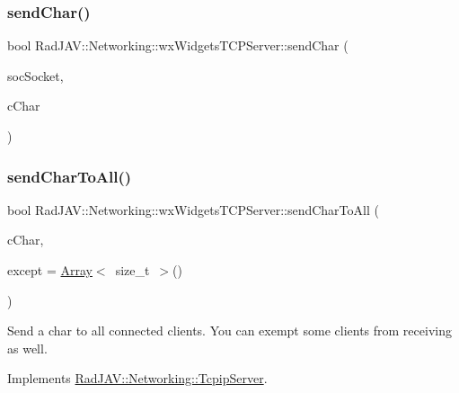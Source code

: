 \subsubsection{\texorpdfstring{send\+Char()}{sendChar()}}
{\footnotesize\ttfamily bool Rad\+J\+A\+V\+::\+Networking\+::wx\+Widgets\+T\+C\+P\+Server\+::send\+Char (\begin{DoxyParamCaption}\item[{wx\+Socket\+Base $\ast$}]{soc\+Socket,  }\item[{char}]{c\+Char }\end{DoxyParamCaption})}

\mbox{\label{class_rad_j_a_v_1_1_networking_1_1wx_widgets_t_c_p_server_a4a78814fc536f2c8a932d3fcf8c2c1dd}} 
\subsubsection{\texorpdfstring{send\+Char\+To\+All()}{sendCharToAll()}}
{\footnotesize\ttfamily bool Rad\+J\+A\+V\+::\+Networking\+::wx\+Widgets\+T\+C\+P\+Server\+::send\+Char\+To\+All (\begin{DoxyParamCaption}\item[{char}]{c\+Char,  }\item[{\mbox{\hyperlink{class_rad_j_a_v_1_1_array}{Array}}$<$ size\+\_\+t $>$}]{except = {\ttfamily \mbox{\hyperlink{class_rad_j_a_v_1_1_array}{Array}}$<$~size\+\_\+t~$>$()} }\end{DoxyParamCaption})\hspace{0.3cm}{\ttfamily [virtual]}}

Send a char to all connected clients. You can exempt some clients from receiving as well. 

Implements \mbox{\hyperlink{class_rad_j_a_v_1_1_networking_1_1_tcpip_server_aa6299798c9db568bd94f3f616226340a}{Rad\+J\+A\+V\+::\+Networking\+::\+Tcpip\+Server}}.

\mbox{\label{class_rad_j_a_v_1_1_networking_1_1wx_widgets_t_c_p_server_a9cc3924985547cc4e63be3d91b57e94a}} 

